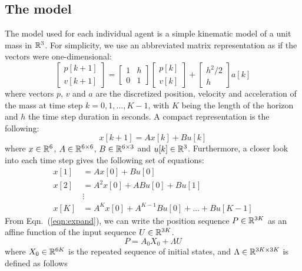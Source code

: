 \subsection{The model}
The model used for each individual agent is a simple kinematic model of a unit mass in ${\mathbb R}^3$. For simplicity, we use an abbreviated matrix representation as if the vectors were one-dimensional:
\begin{equation}
\label{eqn: model}
\begin{bmatrix}
p[k+1]\\
v[k+1]
\end{bmatrix} = \begin{bmatrix}
1 & h\\
0 & 1
\end{bmatrix} \begin{bmatrix}
p[k] \\
v[k]
\end{bmatrix} + \begin{bmatrix}
h^2/2 \\
h
\end{bmatrix}a[k]
\end{equation}
where vectors $p$, $v$ and $a$ are the discretized position, velocity and acceleration of the mass at time step $k = {0,1,\ldots,K-1}$, with $K$ being the length of the horizon and $h$ the time step duration in seconds. A compact representation is the following:
\begin{equation}
x[k+1] = Ax[k] + Bu[k] 
\end{equation}
where $x \in {\mathbb R}^{6}$, $A \in {\mathbb R}^{6\times 6} $, $B \in {\mathbb R}^{6\times 3}$ and $u[k] \in {\mathbb R}^{3}$. Furthermore, a closer look into each time step gives the following set of equations:
\begin{equation}
\label{eqn:expand}
\begin{aligned}
x[1] &= Ax[0] + Bu[0]\\
x[2] &= A^2x[0] + ABu[0] + Bu[1]\\
&\vdots\\
x[K] &= A^{K}x[0] + A^{K-1}Bu[0] + \ldots + Bu[K-1]
\end{aligned}
\end{equation}
From Eqn.~(\ref{eqn:expand}), we can write the position sequence $P \in {\mathbb R}^{3K}$ as an affine function of the input sequence $U \in {\mathbb R}^{3K}$.
\begin{equation}
\label{eqn:model}
P = A_0X_0 + \Lambda U
\end{equation}
where $X_0 \in {\mathbb R}^{6K}$ is the repeated sequence of initial states, and $\Lambda \in {\mathbb R}^{3K \times 3K}$ is defined as follows
